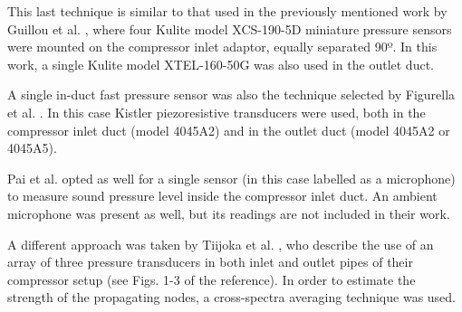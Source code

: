 This last technique is similar to that used in the previously mentioned work by Guillou et al. \cite{guillou2010characterization}, where four Kulite model XCS-190-5D miniature pressure sensors were mounted on the compressor inlet adaptor, equally separated 90º. In this work, a single Kulite model XTEL-160-50G was also used in the outlet duct.

A single in-duct fast pressure sensor was also the technique selected by Figurella et al. \cite{figurella2014noise,figurella2014effect}. In this case Kistler piezoresistive transducers were used, both in the compressor inlet duct (model 4045A2) and in the outlet duct (model 4045A2 or 4045A5). 

Pai et al. \cite{pai2013air,pai2015turbocharger} opted as well for a single sensor (in this case labelled as a microphone) to measure sound pressure level inside the compressor inlet duct. An ambient microphone was present as well, but its readings are not included in their work.

A different approach was taken by Tiijoka et al. \cite{tiikoja2011inves}, who describe the use of an array of three pressure transducers in both inlet and outlet pipes of their compressor setup (see Figs. 1-3 of the reference). In order to estimate the strength of the propagating nodes, a cross-spectra averaging technique was used.

